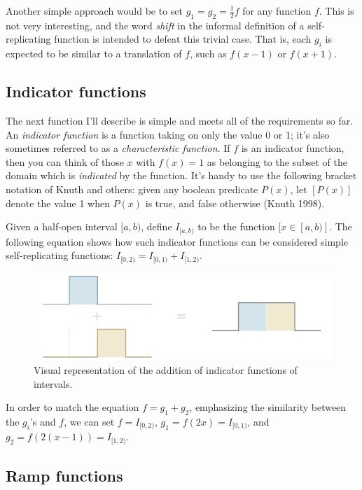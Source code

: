 \documentclass[20pt,]{extarticle}
\begin{document}
Another simple approach would be to set \(g_1 = g_2 = \frac{1}{2}f\) for
any function \(f\). This is not very interesting, and the word
\emph{shift} in the informal definition of a self-replicating function
is intended to defeat this trivial case. That is, each \(g_i\) is
expected to be similar to a translation of \(f\), such as \(f(x-1)\) or
\(f(x+1)\).

\subsection{Indicator functions}\label{indicator-functions}

The next function I'll describe is simple and meets all of the
requirements so far. An \emph{indicator function} is a function taking
on only the value 0 or 1; it's also sometimes referred to as a
\emph{characteristic function}. If \(f\) is an indicator function, then
you can think of those \(x\) with \(f(x) = 1\) as belonging to the
subset of the domain which is \emph{indicated} by the function. It's
handy to use the following bracket notation of Knuth and others: given
any boolean predicate \(P(x)\), let \([P(x)]\) denote the value 1 when
\(P(x)\) is true, and false otherwise (Knuth 1998).

Given a half-open interval \([a, b)\), define \(I_{[a, b)}\) to be the
function \([x\in[a, b)]\). The following equation shows how such
indicator functions can be considered simple self-replicating functions:
\(I_{[0, 2)} = I_{[0, 1)} + I_{[1, 2)}\).

\begin{figure}
\centering
\includegraphics{images/added_intervals6.png}
\caption{Visual representation of the addition of indicator functions of
intervals.}\label{fig:added_intervals}
\end{figure}

In order to match the equation \(f = g_1 + g_2\), emphasizing the
similarity between the \(g_i\)'s and \(f\), we can set
\(f = I_{[0, 2)}\), \(g_1 = f(2x) = I_{[0, 1)}\), and
\(g_2 = f(2(x - 1)) = I_{[1, 2)}\).

\subsection{Ramp functions}\label{sec:ramp_functions}
\end{document}
